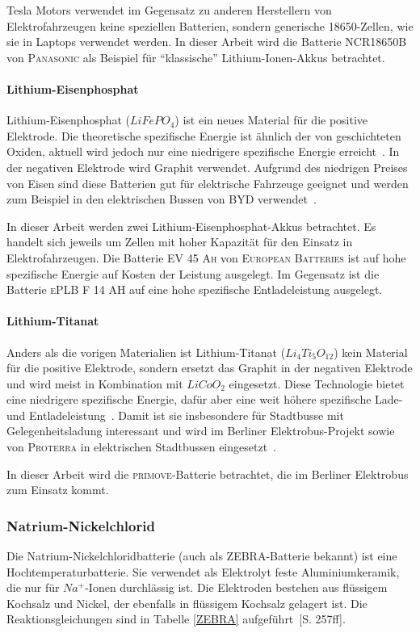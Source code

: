 Tesla Motors verwendet im Gegensatz zu anderen Herstellern von Elektrofahrzeugen keine speziellen Batterien, sondern generische 18650-Zellen, wie sie in Laptops verwendet werden. In dieser Arbeit wird die Batterie \textsc{NCR18650B} von \textsc{Panasonic} als Beispiel für "`klassische"' Lithium-Ionen-Akkus betrachtet.

\paragraph{Lithium-Eisenphosphat}
Lithium-Eisenphosphat ($LiFePO_4$) ist ein neues Material für die positive Elektrode. Die theoretische spezifische Energie ist ähnlich der von geschichteten Oxiden, aktuell wird jedoch nur eine niedrigere spezifische Energie erreicht~\cite{Tie201382}. In der negativen Elektrode wird Graphit verwendet. Aufgrund des niedrigen Preises von Eisen sind diese Batterien gut für elektrische Fahrzeuge geeignet und werden zum Beispiel in den elektrischen Bussen von \textsc{BYD} verwendet~\cite{bydSpecs}.

In dieser Arbeit werden zwei Lithium-Eisenphosphat-Akkus betrachtet. Es handelt sich jeweils um Zellen mit hoher Kapazität für den Einsatz in Elektrofahrzeugen. Die Batterie \textsc{EV 45 Ah} von \textsc{European Batteries} ist auf hohe spezifische Energie auf Kosten der Leistung ausgelegt. Im Gegensatz ist die Batterie \textsc{ePLB F 14 AH} auf eine hohe spezifische Entladeleistung ausgelegt.

\paragraph{Lithium-Titanat}
Anders als die vorigen Materialien ist Lithium-Titanat ($Li_4Ti_5O_{12}$) kein Material für die positive Elektrode, sondern ersetzt das Graphit in der negativen Elektrode und wird meist in Kombination mit $LiCoO_2$ eingesetzt. Diese Technologie bietet eine niedrigere spezifische Energie, dafür aber eine weit höhere spezifische Lade- und Entladeleistung~\cite{veneri2012charging}. Damit ist sie insbesondere für Stadtbusse mit Gelegenheitsladung interessant und wird im Berliner Elektrobus-Projekt sowie von \textsc{Proterra} in elektrischen Stadtbussen eingesetzt~\cite{protCat}.

In dieser Arbeit wird die \textsc{primove}-Batterie betrachtet, die im Berliner Elektrobus zum Einsatz kommt.

\subsubsection{Natrium-Nickelchlorid}
Die Natrium-Nickelchloridbatterie (auch als ZEBRA-Batterie bekannt) ist eine Hochtemperaturbatterie. Sie verwendet als Elektrolyt feste Aluminiumkeramik, die nur für $Na^+$-Ionen durchlässig ist. Die Elektroden bestehen aus flüssigem Kochsalz und Nickel, der ebenfalls in flüssigem Kochsalz gelagert ist. Die Reaktionsgleichungen sind in Tabelle \ref{ZEBRA} aufgeführt~\cite{KiehneBattery}[S. 257ff].

